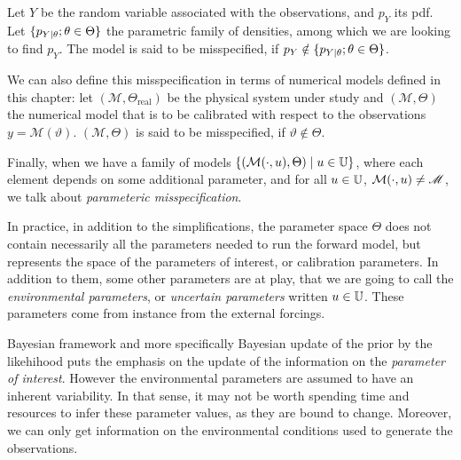 \documentclass[../../Main_ManuscritThese.tex]{subfiles}
\begin{document}
\begin{definition}
  Let $Y$ be the random variable associated with the observations, and $p_Y$ its pdf. Let $\{p_{Y \mid \theta} ; \theta \in \Theta\}$ the parametric family of densities, among which we are looking to find $p_Y$. The model is said to be misspecified, if $p_Y \notin \{p_{Y \mid \theta} ; \theta \in \Theta\}$.

  We can also define this misspecification in terms of numerical models defined in this chapter:  
  let $(\mathscr{M},\Theta_{\mathrm{real}})$ be the physical system under study and $(\mathcal{M},\Theta)$ the numerical model that is to be calibrated with respect to the observations $y=\mathscr{M}(\vartheta)$. $(\mathcal{M}, \Theta)$ is said to be misspecified, if $\vartheta \notin \Theta$.

  Finally, when we have a family of models $\{(\mathcal{M}(\cdot, u),\Theta) \mid u \in\mathbb{U}\}$, where each element depends on some additional parameter, and for all $u\in \mathbb{U}$, $\mathcal{M}(\cdot,u) \neq \mathscr{M}$, we talk about \emph{parameteric misspecification}.
\end{definition}

In practice, in addition to the simplifications, the parameter space $\Theta$ does not contain necessarily all the parameters needed to run the forward model, but represents the space of the parameters of interest, or calibration parameters. In addition to them, some other parameters are at play, that we are going to call the \emph{environmental parameters}, or \emph{uncertain parameters} written $u\in \mathbb{U}$. These parameters come from instance from the external forcings. 



Bayesian framework and more specifically Bayesian update of the prior by the likehihood puts the emphasis on the update of the information on the \emph{parameter of interest}. However the environmental parameters are assumed to have an inherent variability. In that sense, it may not be worth spending time and resources to infer these parameter values, as they are bound to change.
Moreover, we can only get information on the environmental conditions used to generate the observations.

\end{document}
